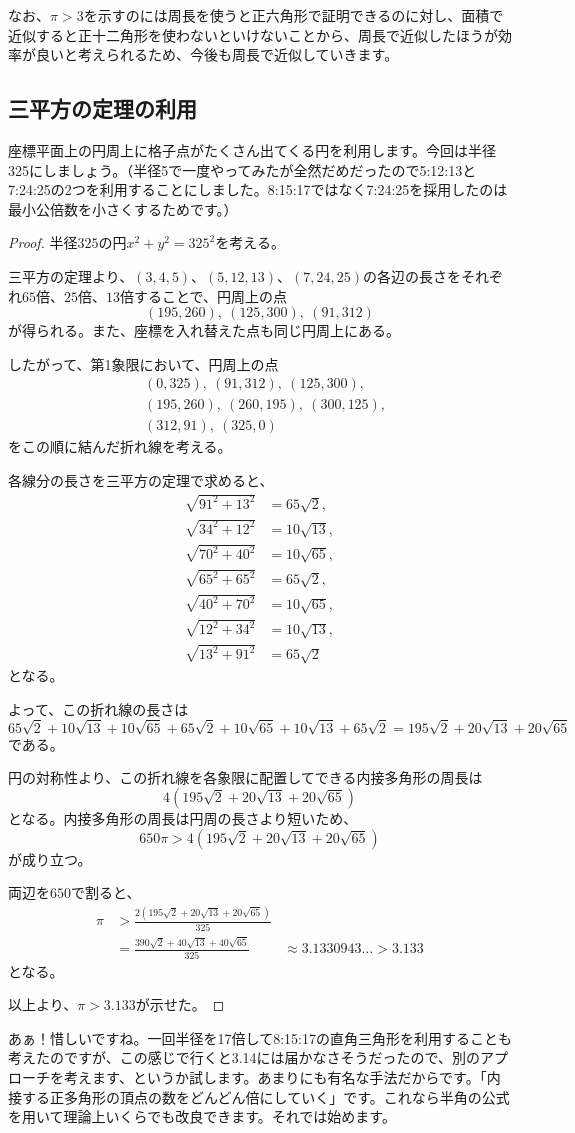\documentclass[dvipdfmx]{jlreq}
\begin{document}
なお、$\pi>3$を示すのには周長を使うと正六角形で証明できるのに対し、面積で近似すると正十二角形を使わないといけないことから、周長で近似したほうが効率が良いと考えられるため、今後も周長で近似していきます。
\subsection{三平方の定理の利用}
座標平面上の円周上に格子点がたくさん出てくる円を利用します。今回は半径325にしましょう。（半径5で一度やってみたが全然だめだったので5:12:13と7:24:25の2つを利用することにしました。8:15:17ではなく7:24:25を採用したのは最小公倍数を小さくするためです。）
\begin{proof}
半径$325$の円$x^2+y^2=325^2$を考える。

三平方の定理より、$(3,4,5)$、$(5,12,13)$、$(7,24,25)$の各辺の長さをそれぞれ$65$倍、$25$倍、$13$倍することで、円周上の点
\[
(195,260),\ (125,300),\ (91,312)
\]
が得られる。また、座標を入れ替えた点も同じ円周上にある。

したがって、第1象限において、円周上の点
\[
\begin{aligned}
&(0,325),\ (91,312),\ (125,300),\\
&(195,260),\ (260,195),\ (300,125),\\
&(312,91),\ (325,0)
\end{aligned}
\]
をこの順に結んだ折れ線を考える。

各線分の長さを三平方の定理で求めると、
\[
\begin{aligned}
\sqrt{91^2+13^2}&=65\sqrt{2},\\
\sqrt{34^2+12^2}&=10\sqrt{13},\\
\sqrt{70^2+40^2}&=10\sqrt{65},\\
\sqrt{65^2+65^2}&=65\sqrt{2},\\
\sqrt{40^2+70^2}&=10\sqrt{65},\\
\sqrt{12^2+34^2}&=10\sqrt{13},\\
\sqrt{13^2+91^2}&=65\sqrt{2}
\end{aligned}
\]
となる。

よって、この折れ線の長さは
\[
65\sqrt{2}+10\sqrt{13}+10\sqrt{65}+65\sqrt{2}+10\sqrt{65}+10\sqrt{13}+65\sqrt{2}
=195\sqrt{2}+20\sqrt{13}+20\sqrt{65}
\]
である。

円の対称性より、この折れ線を各象限に配置してできる内接多角形の周長は
\[
4(195\sqrt{2}+20\sqrt{13}+20\sqrt{65})
\]
となる。内接多角形の周長は円周の長さより短いため、
\[
650\pi>4(195\sqrt{2}+20\sqrt{13}+20\sqrt{65})
\]
が成り立つ。

両辺を$650$で割ると、
\[
\begin{aligned}
\pi
&>\frac{2(195\sqrt{2}+20\sqrt{13}+20\sqrt{65})}{325}\\
&=\frac{390\sqrt{2}+40\sqrt{13}+40\sqrt{65}}{325}\
&\approx3.1330943\dots>3.133
\end{aligned}
\]
となる。

以上より、$\pi>3.133$が示せた。
\end{proof}
あぁ！惜しいですね。一回半径を17倍して8:15:17の直角三角形を利用することも考えたのですが、この感じで行くと3.14には届かなさそうだったので、別のアプローチを考えます、というか試します。あまりにも有名な手法だからです。「内接する正多角形の頂点の数をどんどん倍にしていく」です。これなら半角の公式を用いて理論上いくらでも改良できます。それでは始めます。
\end{document}
